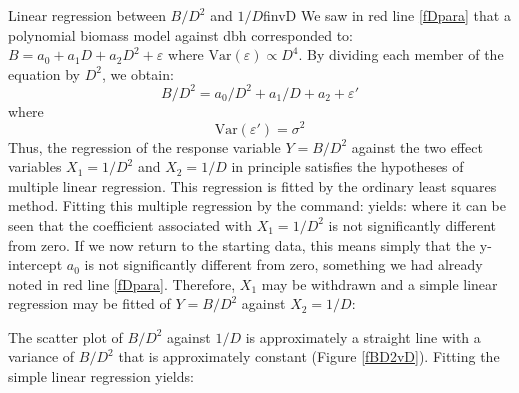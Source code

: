 \begin{filrouge}{Linear regression between $B/D^2$ and $1/D$}{finvD}%
We saw in red line \ref{fDpara} that a polynomial biomass model against dbh corresponded to: $B=a_0+a_1D+a_2D^2+\varepsilon$ where $\mathrm{Var}(\varepsilon)\propto
D^4$. By dividing each member of the equation by $D^2$, we obtain:
\[
B/D^2=a_0/D^2+a_1/D+a_2+\varepsilon'
\]
where
\[
\mathrm{Var}(\varepsilon')=\sigma^2
\]
Thus, the regression of the response variable $Y=B/D^2$ against the two effect variables $X_1=1/D^2$ and $X_2=1/D$ in principle satisfies the hypotheses of multiple linear regression. This regression is fitted by the ordinary least squares method. Fitting this multiple regression by the command:
%
yields:
%
where it can be seen that the coefficient associated with $X_1=1/D^2$ is not significantly different from zero. If we now return to the starting data, this means simply that the y-intercept $a_0$ is not significantly different from zero, something we had already noted in red line \ref{fDpara}. Therefore, $X_1$ may be withdrawn and a simple linear regression may be fitted of $Y=B/D^2$ against $X_2=1/D$:

%
The scatter plot of $B/D^2$ against $1/D$ is approximately a straight line with a variance of $B/D^2$ that is approximately constant (Figure \ref{fBD2vD}). Fitting the simple linear regression yields:


\end{filrouge}
